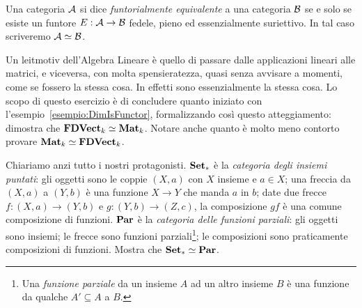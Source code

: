\begin{definizione}
Una categoria \(\mathcal A\) si dice {\em funtorialmente equivalente} a una categoria \(\mathcal B\) se e solo se esiste un funtore \(E : \mathcal A \to \mathcal B\) fedele, pieno ed essenzialmente suriettivo. In tal caso scriveremo \(\mathcal A \simeq \mathcal B\).
\end{definizione}

\begin{esercizio}[\(\FDVect \simeq \Mat\)]
Un leitmotiv dell'Algebra Lineare è quello di passare dalle applicazioni lineari alle matrici, e viceversa, con molta spensieratezza, quasi senza avvisare a momenti, come se fossero la stessa cosa. In effetti sono essenzialmente la stessa cosa. Lo scopo di questo esercizio è di concludere quanto iniziato con l'esempio~\ref{esempio:DimIsFunctor}, formalizzando così questo atteggiamento: dimostra che \(\FDVect \simeq \Mat\). Notare anche quanto è molto meno contorto provare \(\mathbf{Mat}_k \simeq \mathbf{FDVect}_k\).
\end{esercizio}

\begin{esercizio}[\(\pSet \simeq \Par\)]
Chiariamo anzi tutto i nostri protagonisti. \(\mathbf{Set}_\ast\) è la {\em categoria degli insiemi puntati}: gli oggetti sono le coppie \((X, a)\) con \(X\) insieme e \(a \in X\); una freccia da \((X, a)\) a \((Y, b)\) è una funzione \(X \to Y\) che manda \(a\) in \(b\); date due frecce \(f : (X, a) \to (Y, b)\) e \(g : (Y, b) \to (Z, c)\), la composizione \(gf\) è una comune composizione di funzioni. \(\mathbf{Par}\) è la {\em categoria delle funzioni parziali}: gli oggetti sono insiemi; le frecce sono funzioni parziali\footnote{Una {\em funzione parziale} da un insieme \(A\) ad un altro insieme \(B\) è una funzione da qualche \(A' \subseteq A\) a \(B\).}; le composizioni sono praticamente composizioni di funzioni. Mostra che \(\pSet \simeq \Par\).
\end{esercizio}


